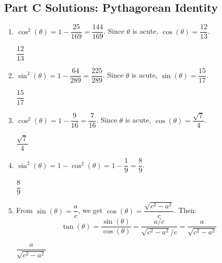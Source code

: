 \documentclass[14pt]{extarticle}
\begin{document}
\subsection*{Part C Solutions: Pythagorean Identity}
\begin{enumerate}
  \item \(\cos^2(\theta) = 1 - \dfrac{25}{169} = \dfrac{144}{169}\). Since \(\theta\) is acute, \(\cos(\theta) = \dfrac{12}{13}\).

  \(\boxed{\dfrac{12}{13}}\)

  \item \(\sin^2(\theta) = 1 - \dfrac{64}{289} = \dfrac{225}{289}\). Since \(\theta\) is acute, \(\sin(\theta) = \dfrac{15}{17}\).

  \(\boxed{\dfrac{15}{17}}\)

  \item \(\cos^2(\theta) = 1 - \dfrac{9}{16} = \dfrac{7}{16}\). Since \(\theta\) is acute, \(\cos(\theta) = \dfrac{\sqrt{7}}{4}\).

  \(\boxed{\dfrac{\sqrt{7}}{4}}\)

  \item \(\sin^2(\theta) = 1 - \cos^2(\theta) = 1 - \dfrac{1}{9} = \dfrac{8}{9}\).

  \(\boxed{\dfrac{8}{9}}\)

  \item From \(\sin(\theta) = \dfrac{a}{c}\), we get \(\cos(\theta) = \dfrac{\sqrt{c^2 - a^2}}{c}\). Then:
  \[
  \tan(\theta) = \frac{\sin(\theta)}{\cos(\theta)} = \frac{a/c}{\sqrt{c^2 - a^2}/c} = \frac{a}{\sqrt{c^2 - a^2}}
  \]

  \(\boxed{\dfrac{a}{\sqrt{c^2 - a^2}}}\)
\end{enumerate}
\end{document}

